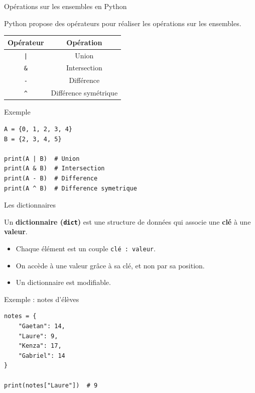 \documentclass[10pt]{beamer}
\begin{document}
\begin{frame}[fragile]{Opérations sur les ensembles en Python}

Python propose des opérateurs pour réaliser les opérations
sur les ensembles.

\begin{center}
\begin{tabular}{c|c}
\textbf{Opérateur} & \textbf{Opération} \\
\hline
\texttt{|} & Union \\
\texttt{\&} & Intersection \\
\texttt{-} & Différence \\
\texttt{\^} & Différence symétrique
\end{tabular}
\end{center}

\begin{exampleblock}{Exemple}
\small
\begin{lstlisting}
A = {0, 1, 2, 3, 4}
B = {2, 3, 4, 5}

print(A | B)  # Union
print(A & B)  # Intersection
print(A - B)  # Difference
print(A ^ B)  # Difference symetrique
\end{lstlisting}
\end{exampleblock}

\end{frame}
\begin{frame}[fragile]{Les dictionnaires}

Un \textbf{dictionnaire (\texttt{dict})} est une structure de données
qui associe une \textbf{clé} à une \textbf{valeur}.

\begin{itemize}
    \item Chaque élément est un couple \texttt{clé : valeur}.
    \item On accède à une valeur grâce à sa clé, et non par sa position.
    \item Un dictionnaire est modifiable.
\end{itemize}

\begin{exampleblock}{Exemple : notes d'élèves}
\small
\begin{lstlisting}
notes = {
    "Gaetan": 14,
    "Laure": 9,
    "Kenza": 17,
    "Gabriel": 14
}

print(notes["Laure"])  # 9
\end{lstlisting}
\end{exampleblock}

\end{frame}
\end{document}
